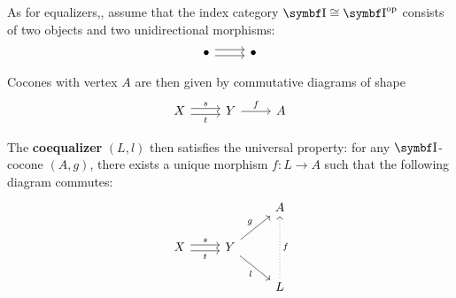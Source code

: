 \begin{definition}\label{def:categorical_coequalizer}\cite[definition 5.2.7]{Leinster2014}
  As for equalizers,, assume that the index category \( \Bold I \cong \Bold{I}^{\Op} \) consists of two objects and two unidirectional morphisms:
  \begin{equation*}
    \begin{tikzcd}
      \bullet \arrow[r, shift left=1] \arrow[r, shift right=1] & \bullet
    \end{tikzcd}
  \end{equation*}

  Cocones with vertex \( A \) are then given by commutative diagrams of shape
  \begin{equation*}
    \begin{tikzcd}
      X \arrow[r, shift left=1, "s"] \arrow[r, shift right=1, "t"'] & Y \arrow[r, "f"] & A
    \end{tikzcd}
  \end{equation*}

  The \textbf{coequalizer} \( (L, l) \) then satisfies the universal property: for any \( \Bold I \)-cocone \( (A, g) \), there exists a unique morphism \( f: L \to A \) such that the following diagram commutes:
  \begin{equation*}
    \begin{tikzcd}
      & & A \\
      X \arrow[r, shift left=1, "s"] \arrow[r, shift right=1, "t"'] & Y \arrow[rd, "l"'] \arrow[ru, "g"] & \\
      & & L \arrow[uu, "f"', dotted]
    \end{tikzcd}
  \end{equation*}
\end{definition}

